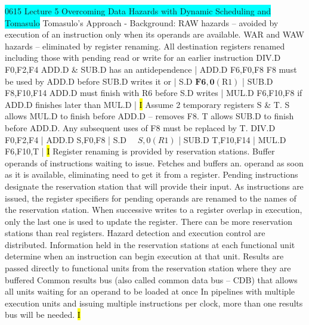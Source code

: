 \documentclass[fontsize=4pt]{scrartcl}
\begin{document}
\colorbox{Cyan}{0615 Lecture 5 Overcoming Data Hazards with Dynamic Scheduling and Tomasulo}
Tomasulo’s Approach - Background: RAW hazards – avoided by execution of an instruction only when its operands are available.
WAR and WAW hazards – eliminated by register renaming. All destination registers renamed including those with pending read or write for an earlier instruction DIV.D F0,F2,F4 ADD.D \& SUB.D has an antidependence | ADD.D F6,F0,F8 F8 must be used by ADD.D before SUB.D writes it or | S.D $\mathbf{F 6 , 0}(\mathrm{R} 1)$ | SUB.D F8,F10,F14 ADD.D must finish with R6 before S.D writes | MUL.D F6,F10,F8 if ADD.D finishes later than MUL.D |
\hl{I}
Assume 2 temporary registers S & T. S allows MUL.D to finish before ADD.D – removes F8. T allows SUB.D to finish before ADD.D. Any subsequent uses of F8 must be replaced by T. DIV.D F0,F2,F4 | ADD.D S,F0,F8 | S.D $\quad S, 0(R 1)$ | SUB.D T,F10,F14 | MUL.D F6,F10,T |
\hl{I}
Register renaming is provided by reservation stations. Buffer operands of instructions waiting to issue. Fetches and buffers an. operand as soon as it is available, eliminating need to get it from a register. Pending instructions designate the reservation station that will provide their input. As instructions are issued, the register specifiers for pending operands are renamed to the names of the reservation station. When successive writes to a register overlap in execution, only the last one is used to update the register. There can be more reservation stations than real registers. Hazard detection and execution control are distributed. Information held in the reservation stations at each functional unit determine when an instruction can begin execution at that unit. Results are passed directly to functional units from the reservation station where they are buffered
Common results bus (also called common data bus – CDB) that allows all units waiting for an operand to be loaded at once
In pipelines with multiple execution units and issuing multiple instructions per clock, more than one results bus will be needed.
\hl{I}
\end{document}
